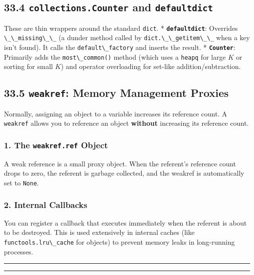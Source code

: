 \hypertarget{collections.counter-and-defaultdict}{%
\subsection{\texorpdfstring{33.4 \texttt{collections.Counter} and
\texttt{defaultdict}}{33.4 collections.Counter and defaultdict}}\label{collections.counter-and-defaultdict}}

These are thin wrappers around the standard
\passthrough{\lstinline!dict!}. *
\textbf{\passthrough{\lstinline!defaultdict!}}: Overrides
\passthrough{\lstinline!\_\_missing\_\_!} (a dunder method called by
\passthrough{\lstinline!dict.\_\_getitem\_\_!} when a key isn't found).
It calls the \passthrough{\lstinline!default\_factory!} and inserts the
result. * \textbf{\passthrough{\lstinline!Counter!}}: Primarily adds the
\passthrough{\lstinline!most\_common()!} method (which uses a
\passthrough{\lstinline!heapq!} for large \(K\) or sorting for small
\(K\)) and operator overloading for set-like addition/subtraction.

\hypertarget{weakref-memory-management-proxies}{%
\subsection{\texorpdfstring{33.5 \texttt{weakref}: Memory Management
Proxies}{33.5 weakref: Memory Management Proxies}}\label{weakref-memory-management-proxies}}

Normally, assigning an object to a variable increases its reference
count. A \passthrough{\lstinline!weakref!} allows you to reference an
object \textbf{without} increasing its reference count.

\hypertarget{the-weakref.ref-object}{%
\subsubsection{\texorpdfstring{1. The \texttt{weakref.ref}
Object}{1. The weakref.ref Object}}\label{the-weakref.ref-object}}

A weak reference is a small proxy object. When the referent's reference
count drops to zero, the referent is garbage collected, and the weakref
is automatically set to \passthrough{\lstinline!None!}.

\hypertarget{internal-callbacks}{%
\subsubsection{2. Internal Callbacks}\label{internal-callbacks}}

You can register a callback that executes immediately when the referent
is about to be destroyed. This is used extensively in internal caches
(like \passthrough{\lstinline!functools.lru\_cache!} for objects) to
prevent memory leaks in long-running processes.

\begin{center}\rule{0.5\linewidth}{0.5pt}\end{center}

\begin{center}\rule{0.5\linewidth}{0.5pt}\end{center}
